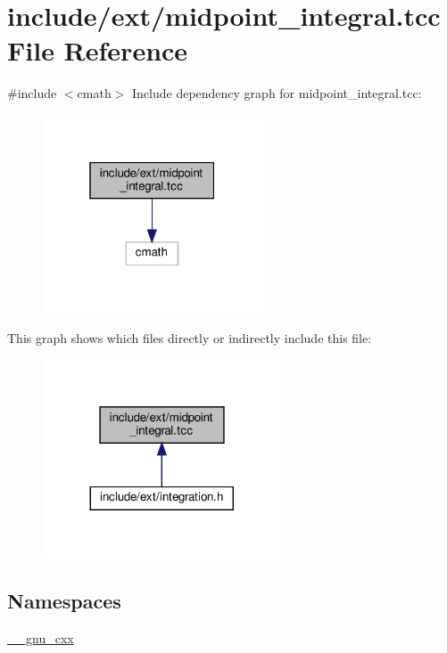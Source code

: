 \hypertarget{midpoint__integral_8tcc}{}\section{include/ext/midpoint\+\_\+integral.tcc File Reference}
\label{midpoint__integral_8tcc}
{\ttfamily \#include $<$cmath$>$}\newline
Include dependency graph for midpoint\+\_\+integral.\+tcc\+:
\nopagebreak
\begin{figure}[H]
\begin{center}
\leavevmode
\includegraphics[width=184pt]{midpoint__integral_8tcc__incl}
\end{center}
\end{figure}
This graph shows which files directly or indirectly include this file\+:
\nopagebreak
\begin{figure}[H]
\begin{center}
\leavevmode
\includegraphics[width=200pt]{midpoint__integral_8tcc__dep__incl}
\end{center}
\end{figure}
\subsection*{Namespaces}
\begin{DoxyCompactItemize}
\item 
 \hyperlink{namespace____gnu__cxx}{\+\_\+\+\_\+gnu\+\_\+cxx}
\end{DoxyCompactItemize}
